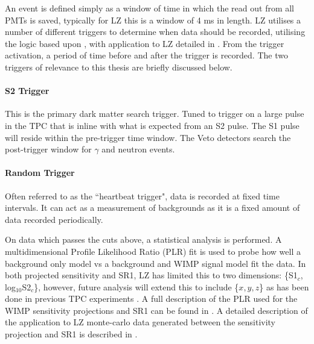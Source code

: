\par
An event is defined simply as a window of time in which the read out from all PMTs is saved, typically for LZ this is a window of 4 ms in length.
LZ utilises a number of different triggers to determine when data should be recorded, utilising the logic based upon \cite{lux_trigger_logic_ref}, with application to LZ detailed in \cite{nicolasangelides_thesis_ref}.
From the trigger activation, a period of time before and after the trigger is recorded.
The two triggers of relevance to this thesis are briefly discussed below.

\paragraph{S2 Trigger}
\par
This is the primary dark matter search trigger.
Tuned to trigger on a large pulse in the TPC that is inline with what is expected from an S2 pulse.
The S1 pulse will reside within the pre-trigger time window.
The Veto detectors search the post-trigger window for $\gamma$ and neutron events.

\paragraph{Random Trigger}
Often referred to as the ``heartbeat trigger", data is recorded at fixed time intervals.
It can act as a measurement of backgrounds as it is a fixed amount of data recorded periodically.

\par
On data which passes the cuts above, a statistical analysis is performed.
A multidimensional Profile Likelihood Ratio (PLR) fit is used to probe how well a background only model vs a background and WIMP signal model fit the data.
In both projected sensitivity and SR1, LZ has limited this to two dimensions: \{S1$_c$, log$_{10}$S2$_c$\}, however, future analysis will extend this to include \{$x,y,z$\} as has been done in previous TPC experiments \cite{LUX_RUN1_EFT_2021,LUX_RUN4_EFT_2021,shaunalsum_thesis_ref}.
A full description of the PLR used for the WIMP sensitivity projections and SR1 can be found in \cite{LZ_Ibles_LZStats_Thesis_ref}. 
A detailed description of the application to LZ monte-carlo data generated between the sensitivity projection and SR1 is described in \cite{jonathannikoleyczik_thesis_ref}.

